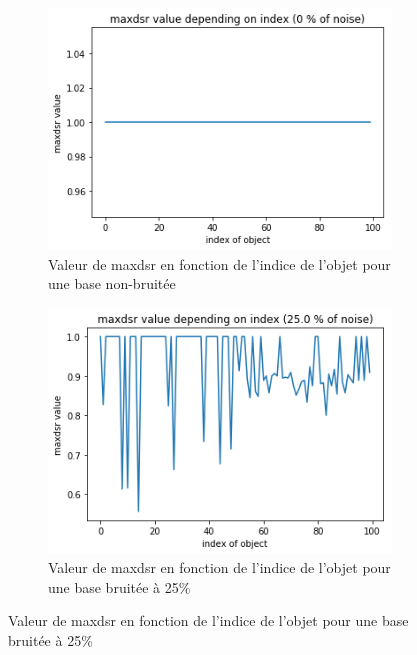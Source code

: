 \documentclass[a4paper]{article}
\begin{document}
\begin{figure}[H]
	\centering
    \begin{subfigure}[c]{0.46\textwidth}
	    \centering
        \includegraphics[width=\textwidth]{images/maxdsr_0.png}
        \caption{Valeur de maxdsr en fonction de l'indice de l'objet pour une base
        non-bruitée}
        \label{img:maxdsr0}
    \end{subfigure}
    \begin{subfigure}[c]{0.46\textwidth}
	    \centering
	    \includegraphics[width=\textwidth]{images/maxdsr_25.png}
        \caption{Valeur de maxdsr en fonction de l'indice de l'objet pour une base
        bruitée à 25\%}
        \label{img:maxdsr25}
    \end{subfigure}


\end{figure}
\end{document}
